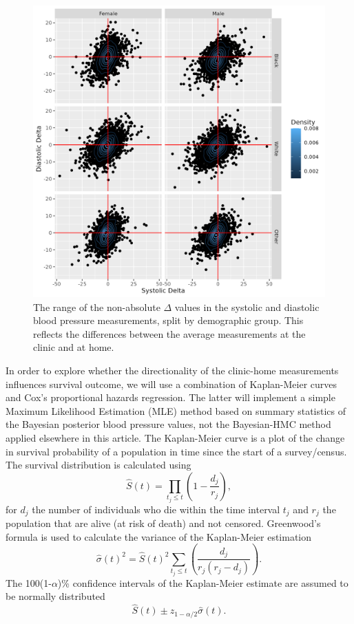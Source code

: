 \documentclass[
]{article}
\begin{document}
\begin{figure}
\hypertarget{fig:DeltaDensities}{%
\centering
\includegraphics{./Rmarkdown_Plots/Delta_plusminus_Demography.png}
\caption{The range of the non-absolute \(\Delta\) values in the systolic and diastolic blood pressure measurements, split by demographic group. This reflects the differences between the average measurements at the clinic and at home.}\label{fig:DeltaDensities}
}
\end{figure}

In order to explore whether the directionality of the clinic-home measurements influences survival outcome, we will use a combination of Kaplan-Meier curves and Cox's proportional hazards regression. The latter will implement a simple Maximum Likelihood Estimation (MLE) method based on summary statistics of the Bayesian posterior blood pressure values, not the Bayesian-HMC method applied elsewhere in this article. The Kaplan-Meier curve is a plot of the change in survival probability of a population in time since the start of a survey/census. The survival distribution is calculated using
\begin{equation}\label{survKM}
\hat{S}(t)=\prod_{t_j \le t}\left(1-\frac{d_j}{r_j} \right),
\end{equation}
for \(d_j\) the number of individuals who die within the time interval \(t_j\) and \(r_j\) the population that are alive (at risk of death) and not censored. Greenwood's formula is used to calculate the variance of the Kaplan-Meier estimation
\begin{equation}\label{sigKM}
\hat{\sigma}(t)^2=\hat{S}(t)^2\sum_{t_j \le t}\left(\frac{d_j}{r_j(r_j-d_j)} \right).
\end{equation}
The 100(1-\(\alpha\))\% confidence intervals of the Kaplan-Meier estimate are assumed to be normally distributed
\begin{equation}\label{CIKM}
\hat{S}(t) \pm z_{1-\alpha/2}\hat{\sigma}(t).
\end{equation}
\end{document}
